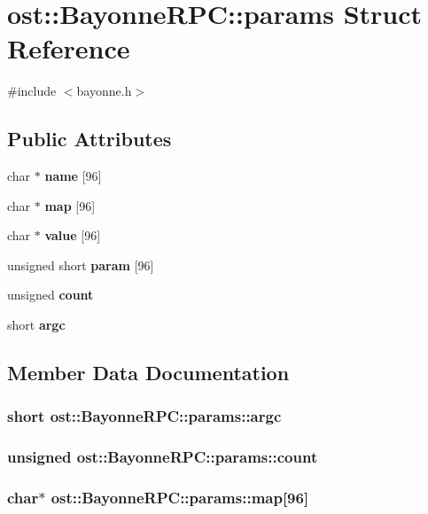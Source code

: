\section{ost::BayonneRPC::params Struct Reference}
\label{structost_1_1_bayonne_r_p_c_1_1params}


{\ttfamily \#include $<$bayonne.h$>$}\subsection*{Public Attributes}
\begin{DoxyCompactItemize}
\item 
char $\ast$ {\bf name} [96]
\item 
char $\ast$ {\bf map} [96]
\item 
char $\ast$ {\bf value} [96]
\item 
unsigned short {\bf param} [96]
\item 
unsigned {\bf count}
\item 
short {\bf argc}
\end{DoxyCompactItemize}


\subsection{Member Data Documentation}
\subsubsection[{argc}]{\setlength{\rightskip}{0pt plus 5cm}short {\bf ost::BayonneRPC::params::argc}}\label{structost_1_1_bayonne_r_p_c_1_1params_a4d2bf3e9305b158c955bfc9c5c0f714d}
\subsubsection[{count}]{\setlength{\rightskip}{0pt plus 5cm}unsigned {\bf ost::BayonneRPC::params::count}}\label{structost_1_1_bayonne_r_p_c_1_1params_ac39ec06df63e06f2ee87780b359c4991}
\subsubsection[{map}]{\setlength{\rightskip}{0pt plus 5cm}char$\ast$ {\bf ost::BayonneRPC::params::map}[96]}\label{structost_1_1_bayonne_r_p_c_1_1params_a5800830206686d9c9b33e286489600b2}
